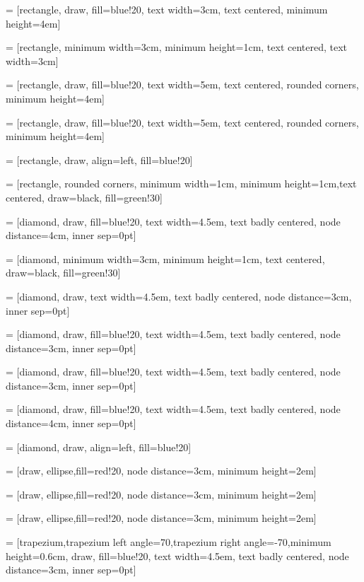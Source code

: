  = [rectangle, draw, fill=blue!20, text width=3cm, text centered, minimum height=4em]

 = [rectangle, minimum width=3cm, minimum height=1cm, text centered, text width=3cm]

 = [rectangle, draw, fill=blue!20, text width=5em, text centered, rounded corners, minimum height=4em]

 = [rectangle, draw, fill=blue!20, text width=5em, text centered, rounded corners, minimum height=4em]

 = [rectangle, draw, align=left, fill=blue!20]

 = [rectangle, rounded corners, minimum width=1cm, minimum height=1cm,text centered, draw=black, fill=green!30]

 = [diamond, draw, fill=blue!20, text width=4.5em, text badly centered, node distance=4cm, inner sep=0pt]

 = [diamond, minimum width=3cm, minimum height=1cm, text centered, draw=black, fill=green!30]

 = [diamond, draw, text width=4.5em, text badly centered, node distance=3cm, inner sep=0pt]

 = [diamond, draw, fill=blue!20, text width=4.5em, text badly centered, node distance=3cm, inner sep=0pt]

 = [diamond, draw, fill=blue!20, text width=4.5em, text badly centered, node distance=3cm, inner sep=0pt]

 = [diamond, draw, fill=blue!20, text width=4.5em, text badly centered, node distance=4cm, inner sep=0pt]

 = [diamond, draw, align=left, fill=blue!20]

 = [draw, ellipse,fill=red!20, node distance=3cm, minimum height=2em]

 = [draw, ellipse,fill=red!20, node distance=3cm, minimum height=2em]

 = [draw, ellipse,fill=red!20, node distance=3cm, minimum height=2em]

 = [trapezium,trapezium left angle=70,trapezium right angle=-70,minimum height=0.6cm, draw, fill=blue!20, text width=4.5em, text badly centered, node distance=3cm, inner sep=0pt]

